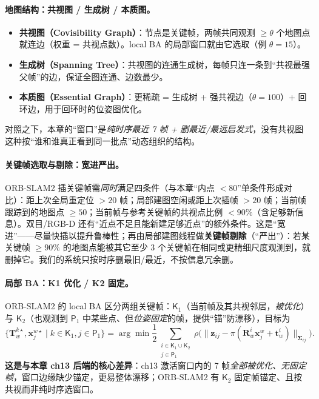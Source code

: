 \paragraph{地图结构：共视图 / 生成树 / 本质图。}
\begin{itemize}
  \item \textbf{共视图（Covisibility Graph）}\cite{murartal2015orbslam}：节点是关键帧，两帧共同观测 $\ge\theta$ 个地图点就连边（权重 = 共视点数）。local BA 的局部窗口就由它选取（例 $\theta=15$）。
  \item \textbf{生成树（Spanning Tree）}：共视图的连通生成树，每帧只连一条到“共视最强父帧”的边，保证全图连通、边数最少。
  \item \textbf{本质图（Essential Graph）}：更稀疏 = 生成树 + 强共视边（$\theta=100$）+ 回环边，用于回环时的位姿图优化。
\end{itemize}
对照之下，本章的“窗口”是\emph{纯时序最近 7 帧 + 删最近/最远启发式}，没有共视图这种按“谁和谁真正看到同一批点”动态组织的结构。

\paragraph{关键帧选取与剔除：宽进严出。}
ORB-SLAM2 插关键帧需\emph{同时}满足四条件（与本章“内点 $<80$”单条件形成对比）：距上次全局重定位 $>20$ 帧；局部建图空闲或距上次插帧 $>20$ 帧；当前帧跟踪到的地图点 $\ge50$；当前帧与参考关键帧的共视点比例 $<90\%$（含足够新信息）。双目/RGB-D 还有“近点不足且能新建足够近点”的额外条件。这是“宽进”——尽量快插以提升鲁棒性；再由局部建图线程做\textbf{关键帧剔除}（“严出”）：若某关键帧 $\ge90\%$ 的地图点能被其它至少 3 个关键帧在相同或更精细尺度观测到，就删掉它。我们的系统只按时序删最旧/最近，不按信息冗余删。

\paragraph{局部 BA：K1 优化 / K2 固定。}
ORB-SLAM2 的 local BA 区分两组关键帧：$\mathsf{K}_1$（当前帧及其共视邻居，\emph{被优化}）与 $\mathsf{K}_2$（也观测到 $\mathsf{P}_1$ 中某些点、但\emph{位姿固定}的帧，提供“锚”防漂移），目标为
\begin{equation}
\big\{\mathbf{T}_w^{k\star},\mathbf{x}_j^{w\star}\mid k\in\mathsf{K}_1, j\in\mathsf{P}_1\big\}
=\arg\min\frac12\!\!\sum_{\substack{i\in\mathsf{K}_1\cup\mathsf{K}_2\\ j\in\mathsf{P}_1}}\!\!
\rho\Big(\big\|\mathbf{z}_{ij}-\pi(\mathbf{R}_w^i\mathbf{x}_j^w+\mathbf{t}_w^i)\big\|_{\boldsymbol\Sigma_{ij}}\Big).
\label{eq:sys-orb-localba}
\end{equation}
\textbf{这是与本章 ch13 后端的核心差异}：ch13 激活窗口内的 7 帧\emph{全部被优化、无固定帧}，窗口边缘缺少锚定，更易整体漂移；ORB-SLAM2 有 $\mathsf{K}_2$ 固定帧锚定、且按共视而非纯时序选窗口。

